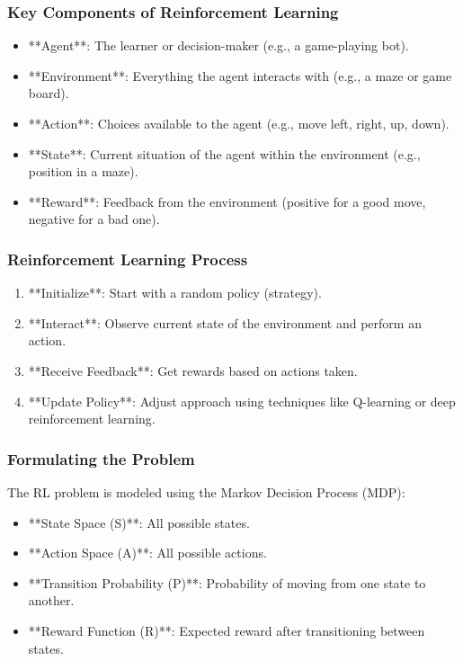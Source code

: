\documentclass[aspectratio=169]{beamer}
\begin{document}
\begin{frame}[fragile]
    \frametitle{Key Components of Reinforcement Learning}
    \begin{itemize}
        \item **Agent**: The learner or decision-maker (e.g., a game-playing bot).
        \item **Environment**: Everything the agent interacts with (e.g., a maze or game board).
        \item **Action**: Choices available to the agent (e.g., move left, right, up, down).
        \item **State**: Current situation of the agent within the environment (e.g., position in a maze).
        \item **Reward**: Feedback from the environment (positive for a good move, negative for a bad one).
    \end{itemize}
\end{frame}

\begin{frame}[fragile]
    \frametitle{Reinforcement Learning Process}
    \begin{enumerate}
        \item **Initialize**: Start with a random policy (strategy).
        \item **Interact**: Observe current state of the environment and perform an action.
        \item **Receive Feedback**: Get rewards based on actions taken.
        \item **Update Policy**: Adjust approach using techniques like Q-learning or deep reinforcement learning.
    \end{enumerate}
\end{frame}

\begin{frame}[fragile]
    \frametitle{Formulating the Problem}
    The RL problem is modeled using the Markov Decision Process (MDP):
    \begin{itemize}
        \item **State Space (S)**: All possible states.
        \item **Action Space (A)**: All possible actions.
        \item **Transition Probability (P)**: Probability of moving from one state to another.
        \item **Reward Function (R)**: Expected reward after transitioning between states.
    \end{itemize}
\end{frame}
\end{document}
